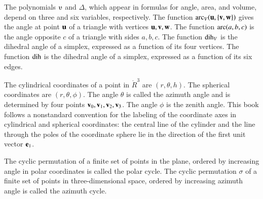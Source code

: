 The polynomials $\ups$ and $\Delta$, which appear in
formulas for angle, area, and volume, depend on three and six
variables, respectively.  The function $\operatorname{arc}_V({\mathbf u},\{{\mathbf v},{\mathbf w}\})$ gives
the angle at point ${\mathbf u}$ of a triangle with vertices ${\mathbf u},{\mathbf v},{\mathbf w}$.  The
function $\operatorname{arc}(a,b,c)$ is the angle opposite $c$ of a triangle with
sides $a,b,c$.  The function $\operatorname{dih}_V$ is the dihedral angle of a
simplex, expressed as a function of its four vertices.  The function
$\operatorname{dih}$ is the dihedral angle of a simplex, expressed as a function of
its six edges.

The cylindrical coordinates of a point in $\ring{R}^3$ are
$(r,\theta,h)$.  The spherical coordinates are $(r,\theta,\phi)$.  The
angle $\theta$ is called the azimuth angle and is determined by four
points ${\mathbf v}_0,{\mathbf v}_1,{\mathbf v}_2,{\mathbf v}_3$.  The angle $\phi$ is the zenith angle.
This book follows a nonstandard convention for the labeling of the
coordinate axes in cylindrical and spherical coordinates: the central
line of the cylinder and the line through the poles of the coordinate
sphere lie in the direction of the first unit vector ${\mathbf e}_1$.

The cyclic permutation of a finite set of points in the plane, ordered
by increasing angle in polar coordinates is called the polar cycle.
The cyclic permutation $\sigma$ of a finite set of points in
three-dimensional space, ordered by increasing azimuth angle is called
the azimuth cycle.


